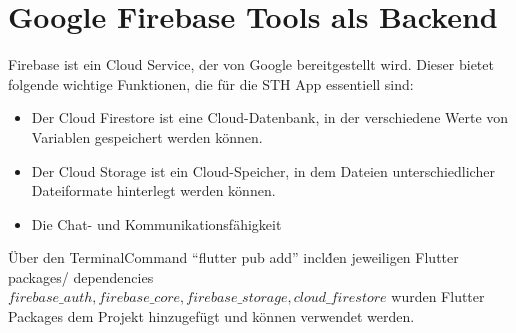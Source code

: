 \section{Google Firebase Tools als Backend}
Firebase ist ein Cloud Service, der von Google bereitgestellt wird.
Dieser bietet folgende wichtige Funktionen, die für die STH App essentiell sind:
\begin{itemize}
    \item Der Cloud Firestore ist eine Cloud-Datenbank, in der verschiedene Werte von Variablen gespeichert werden können.
    \item Der Cloud Storage ist ein Cloud-Speicher, in dem Dateien unterschiedlicher Dateiformate hinterlegt werden können.
    \item Die Chat- und Kommunikationsfähigkeit
\end{itemize}
Über den Terminal\-Command ``flutter pub add'' incl\. den jeweiligen Flutter packages/ dependencies \(firebase\_auth, firebase\_core, firebase\_storage, cloud\_firestore\) wurden Flutter Packages dem Projekt hinzugefügt und können verwendet werden.

